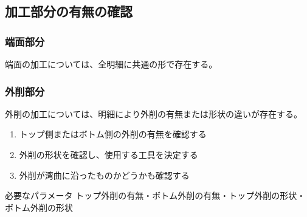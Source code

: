 \subsection{加工部分の有無の確認}

\subsubsection{端面部分}
端面の加工については、全明細に共通の形で存在する。

\subsubsection{外削部分}
外削の加工については、明細により外削の有無または形状の違いが存在する。
\begin{enumerate}
\item トップ側またはボトム側の外削の有無を確認する
\item {}外削の形状を確認し、使用する工具を決定する
\item {}外削が湾曲に沿ったものかどうかも確認する
\end{enumerate}
\begin{Parameter}{必要なパラメータ}
トップ外削の有無・ボトム外削の有無・トップ外削の形状・ボトム外削の形状
\end{Parameter}

\clearpage
